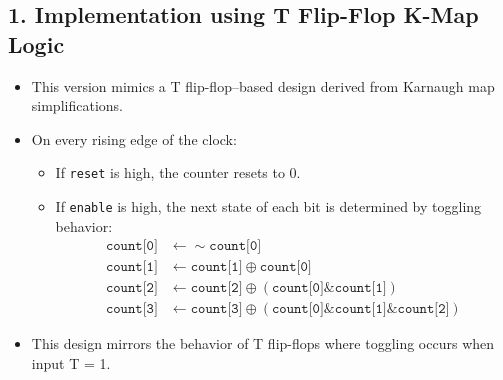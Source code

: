 \documentclass{article}
\begin{document}
\subsection*{1. Implementation using T Flip-Flop K-Map Logic}
\begin{itemize}
	\item This version mimics a T flip-flop–based design derived from Karnaugh map simplifications.
	\item On every rising edge of the clock:
	      \begin{itemize}
		      \item If \texttt{reset} is high, the counter resets to 0.
		      \item If \texttt{enable} is high, the next state of each bit is determined by toggling behavior:
		            \begin{align*}
			            \texttt{count[0]} & \leftarrow \sim \texttt{count[0]}                                                                 \\
			            \texttt{count[1]} & \leftarrow \texttt{count[1]} \oplus \texttt{count[0]}                                             \\
			            \texttt{count[2]} & \leftarrow \texttt{count[2]} \oplus (\texttt{count[0]} \& \texttt{count[1]})                      \\
			            \texttt{count[3]} & \leftarrow \texttt{count[3]} \oplus (\texttt{count[0]} \& \texttt{count[1]} \& \texttt{count[2]})
		            \end{align*}
	      \end{itemize}
	\item This design mirrors the behavior of T flip-flops where toggling occurs when input T = 1.
\end{itemize}
\end{document}
